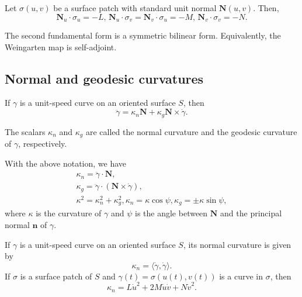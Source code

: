 \begin{lemma}
  Let $\sigma(u, v)$ be a surface patch with standard unit normal
  $\bm{N}(u, v)$. Then,
  \[
    \bm{N}_u \cdot \sigma_u = -L,\,
    \bm{N}_u \cdot \sigma_v = \bm{N}_v \cdot  \sigma_u = -M,\,
    \bm{N}_v \cdot \sigma_v = -N.
  \]
\end{lemma}

\begin{corollary}
  The second fundamental form is a symmetric bilinear form.
  Equivalently, the Weingarten map is self-adjoint.
\end{corollary}

\subsection{Normal and geodesic curvatures}

If $\gamma$ is a unit-speed curve on an oriented surface $S$, then
\[
  \ddot{\gamma} = \kappa_n \bm{N} + \kappa_g \bm{N} \times \dot{\gamma}.
\]

\begin{defn}
  The scalars $\kappa_n$ and $\kappa_g$ are called the normal curvature
  and the geodesic curvature of $\gamma$, respectively.
\end{defn}

\begin{proposition}
  With the above notation, we have
  \begin{gather*}
    \kappa_n = \ddot{\gamma} \cdot \bm{N},\\
    \kappa_g = \ddot{\gamma} \cdot (\bm{N} \times \dot{\gamma}),\\
    \kappa^2 = \kappa_n^2 + \kappa_g^2,
    \kappa_n = \kappa \cos \psi,
    \kappa_g = \pm \kappa \sin \psi,
  \end{gather*}
  where $\kappa$ is the curvature of $\gamma$ and
  $\psi$ is the angle between $\bm{N}$ and the principal normal
  $\bm{n}$ of $\gamma$.
\end{proposition}

\begin{proposition}
  If $\gamma$ is a unit-speed curve on an oriented surface $S$,
  its normal curvature is given by
  \[
    \kappa_n = \langle \dot{\gamma}, \dot{\gamma} \rangle.
  \]
  If $\sigma$ is a surface patch of $S$ and $\gamma(t) = \sigma(u(t), v(t))$
  is a curve in $\sigma$, then
  \[
    \kappa_n = L \dot{u}^2 + 2 M \dot{u}  \dot{v}+ N \dot{v}^2.
  \]
\end{proposition}

